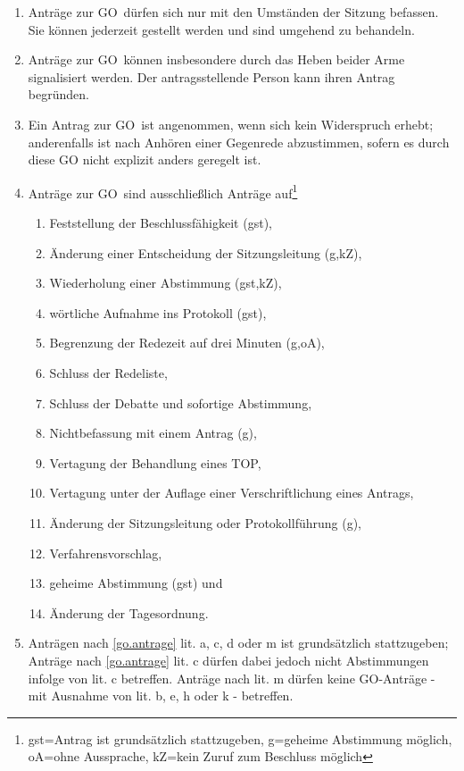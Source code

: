 \documentclass[a4paper, 12pt, ngerman]{article}
\newcommand{\go}{GO}
\begin{document}
\begin{enumerate}[leftmargin=0cm]
	\begin{enumerate}[leftmargin=0cm]
		\item Anträge zur \go~dürfen sich nur mit den Umständen der Sitzung befassen. Sie können jederzeit gestellt werden und sind umgehend zu behandeln.
		\item Anträge zur \go~können insbesondere durch das Heben beider Arme signalisiert werden. Der antragsstellende Person kann ihren Antrag begründen.
		\item Ein Antrag zur \go~ist angenommen, wenn sich kein
		Widerspruch erhebt; anderenfalls ist nach Anhören einer
		Gegenrede abzustimmen, sofern es durch diese GO nicht explizit anders geregelt ist. 
		\item Anträge zur \go~sind ausschließlich Anträge auf\footnote{gst=Antrag ist grundsätzlich stattzugeben, g=geheime Abstimmung möglich, oA=ohne Aussprache, kZ=kein Zuruf zum Beschluss möglich}
		\begin{enumerate}[leftmargin=0.5cm]\label{go.antrage}
			\item Feststellung der Beschlussfähigkeit (gst),
			\item Änderung einer Entscheidung der Sitzungsleitung (g,kZ),
			\item Wiederholung einer Abstimmung (gst,kZ),
			\item wörtliche Aufnahme ins Protokoll (gst),
			\item Begrenzung der Redezeit auf drei Minuten (g,oA),
			\item Schluss der Redeliste,
			\item Schluss der Debatte und sofortige Abstimmung,
			\item Nichtbefassung mit einem Antrag (g),	
			\item Vertagung der Behandlung eines TOP,
			\item Vertagung unter der Auflage einer Verschriftlichung eines Antrags,
			\item Änderung der Sitzungsleitung oder Protokollführung (g),
			\item Verfahrensvorschlag,
			\item geheime Abstimmung (gst) und
			\item Änderung der Tagesordnung. 
		\end{enumerate}
		\item Anträgen nach \cref{go.antrage} lit. a, c, d oder m ist grundsätzlich stattzugeben; Anträge nach \cref{go.antrage} lit. c dürfen dabei jedoch nicht Abstimmungen infolge von lit. c betreffen. Anträge nach lit. m dürfen keine GO-Anträge - mit Ausnahme von lit. b, e, h oder k - betreffen.\label{go.ratsantrag}

\end{enumerate}
\end{enumerate}
\end{document}
